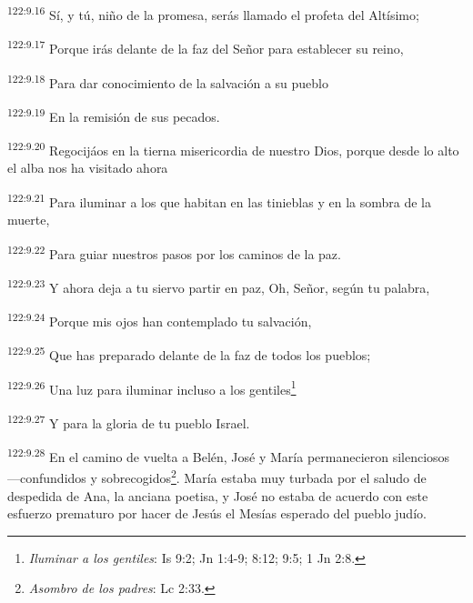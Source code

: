 \par
\textsuperscript{122:9.16} Sí, y tú, niño de la promesa, serás llamado el profeta del Altísimo;

\par
\textsuperscript{122:9.17} Porque irás delante de la faz del Señor para establecer su reino,

\par
\textsuperscript{122:9.18} Para dar conocimiento de la salvación a su pueblo

\par
\textsuperscript{122:9.19} En la remisión de sus pecados.

\par
\textsuperscript{122:9.20} Regocijáos en la tierna misericordia de nuestro Dios, porque desde lo alto el alba nos ha visitado ahora

\par
\textsuperscript{122:9.21} Para iluminar a los que habitan en las tinieblas y en la sombra de la muerte,

\par
\textsuperscript{122:9.22} Para guiar nuestros pasos por los caminos de la paz.

\par
\textsuperscript{122:9.23} Y ahora deja a tu siervo partir en paz, Oh, Señor, según tu palabra,

\par
\textsuperscript{122:9.24} Porque mis ojos han contemplado tu salvación,

\par
\textsuperscript{122:9.25} Que has preparado delante de la faz de todos los pueblos;

\par
\textsuperscript{122:9.26} Una luz para iluminar incluso a los gentiles\footnote{\textit{Iluminar a los gentiles}: Is 9:2; Jn 1:4-9; 8:12; 9:5; 1 Jn 2:8.}

\par
\textsuperscript{122:9.27} Y para la gloria de tu pueblo Israel.

\par
\textsuperscript{122:9.28} En el camino de vuelta a Belén, José y María permanecieron silenciosos ---confundidos y sobrecogidos\footnote{\textit{Asombro de los padres}: Lc 2:33.}. María estaba muy turbada por el saludo de despedida de Ana, la anciana poetisa, y José no estaba de acuerdo con este esfuerzo prematuro por hacer de Jesús el Mesías esperado del pueblo judío.

